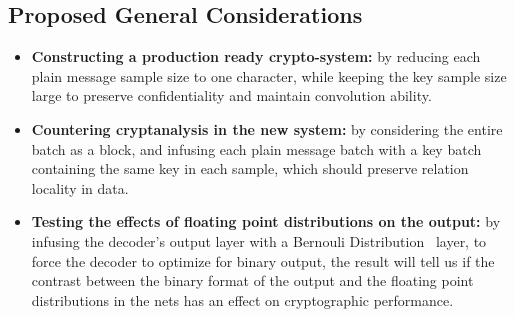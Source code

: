 \documentclass[a4paper, 12pt]{report}
\begin{document}
\subsection*{\textbf{Proposed General Considerations}}
	\begin{itemize}[nosep]
		\item \textbf{Constructing a production ready crypto-system:} by reducing each plain message sample size to one character, while keeping the key sample size large to preserve confidentiality and maintain convolution ability.
		\item \textbf{Countering cryptanalysis in the new system:} by considering the entire batch as a block, and infusing each plain message batch with a key batch containing the same key in each sample, which should preserve relation locality in data.
		\item \textbf{Testing the effects of floating point distributions on the output:} by infusing the decoder's output layer with a Bernouli Distribution~\citep{http://mathworld.wolfram.com/BernoulliDistribution.html} layer, to force the decoder to optimize for binary output, the result will tell us if the contrast between the binary format of the output and the floating point distributions in the nets has an effect on cryptographic performance.
	\end{itemize}
\end{document}
